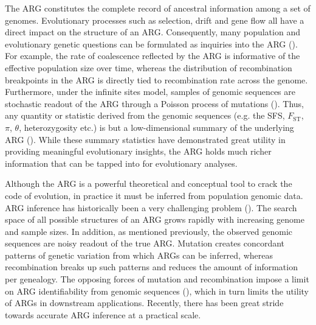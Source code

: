 The \ac{ARG} constitutes the complete record of ancestral information among a set of genomes. Evolutionary processes such as selection, drift and gene flow all have a direct impact on the structure of an \ac{ARG}. Consequently, many population and evolutionary genetic questions can be formulated as inquiries into the \ac{ARG} (\cite{rasmussen_genome-wide_2014,lewanski2023era}). For example, the rate of coalescence reflected by the \ac{ARG} is informative of the effective population size over time, whereas the distribution of recombination breakpoints in the \ac{ARG} is directly tied to recombination rate across the genome. Furthermore, under the infinite sites model, samples of genomic sequences are stochastic readout of the \ac{ARG} through a Poisson process of mutations (\cite{wakeley2005coalescent}). Thus, any quantity or statistic derived from the genomic sequences (e.g. the \acs{SFS}, $F_{\mathrm{ST}}$, $\pi$, $\theta$, heterozygosity etc.) is but a low-dimensional summary of the underlying \ac{ARG} (\cite{ralph2020efficiently}). While these summary statistics have demonstrated great utility in providing meaningful evolutionary insights, the \ac{ARG} holds much richer information that can be tapped into for evolutionary analyses.


Although the \ac{ARG} is a powerful theoretical and conceptual tool to crack the code of evolution, in practice it must be inferred from population genomic data. \ac{ARG} inference has historically been a very challenging problem (\cite{rasmussen_genome-wide_2014,mathieson_what_2020}). The search space of all possible structures of an \ac{ARG} grows rapidly with increasing genome and sample sizes. In addition, as mentioned previously, the observed genomic sequences are noisy readout of the true \ac{ARG}. Mutation creates concordant patterns of genetic variation from which \acp{ARG} can be inferred, whereas recombination breaks up such patterns and reduces the amount of information per genealogy. The opposing forces of mutation and recombination impose a limit on \ac{ARG} identifiability from genomic sequences (\cite{hubisz2020inference,hayman2023recoverability}), which in turn limits the utility of \acp{ARG} in downstream applications. Recently, there has been great stride towards accurate \ac{ARG} inference at a practical scale. 

